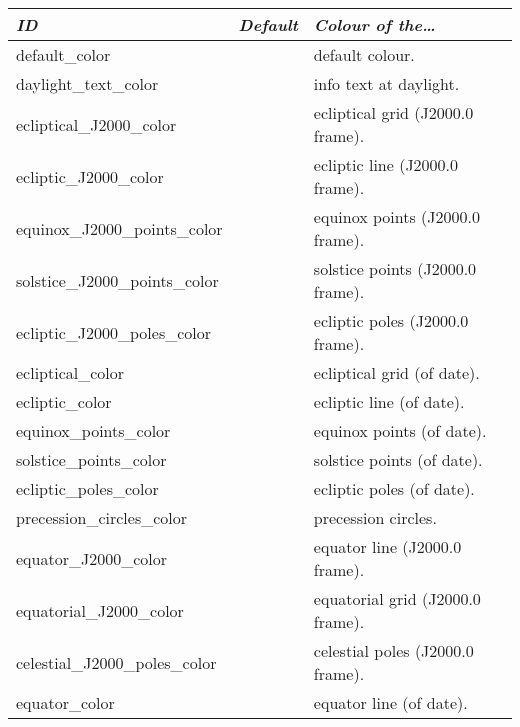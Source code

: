 \begin{longtabu} to \textwidth {l|l|X}
\toprule
\emph{ID}	                            & \emph{Default}      & \emph{Colour of the\ldots}\\
\midrule
default\_color           				&  & default colour.\\\midrule
daylight\_text\_color            		&  & info text at daylight. \\\midrule
ecliptical\_J2000\_color 				&  &  ecliptical grid (J2000.0 frame). \\\midrule
ecliptic\_J2000\_color   				&  &  ecliptic line (J2000.0 frame). \\\midrule
equinox\_J2000\_points\_color			&  &  equinox points (J2000.0 frame). \\\midrule
solstice\_J2000\_points\_color			&  &  solstice points (J2000.0 frame). \\\midrule
ecliptic\_J2000\_poles\_color			&  &  ecliptic poles (J2000.0 frame). \\\midrule
ecliptical\_color        				&  &  ecliptical grid (of date). \\\midrule
ecliptic\_color          				&  &  ecliptic line (of date). \\\midrule
equinox\_points\_color					&  &  equinox points (of date). \\\midrule
solstice\_points\_color					&  &  solstice points (of date). \\\midrule
ecliptic\_poles\_color					&  &  ecliptic poles (of date). \\\midrule
precession\_circles\_color 				&  &  precession circles. \\\midrule
equator\_J2000\_color      				&  &  equator line (J2000.0 frame). \\\midrule
equatorial\_J2000\_color 				&  &  equatorial grid (J2000.0 frame). \\\midrule
celestial\_J2000\_poles\_color			&  &  celestial poles (J2000.0 frame). \\\midrule
equator\_color           				&  &  equator line (of date). \\\midrule

\end{longtabu}
